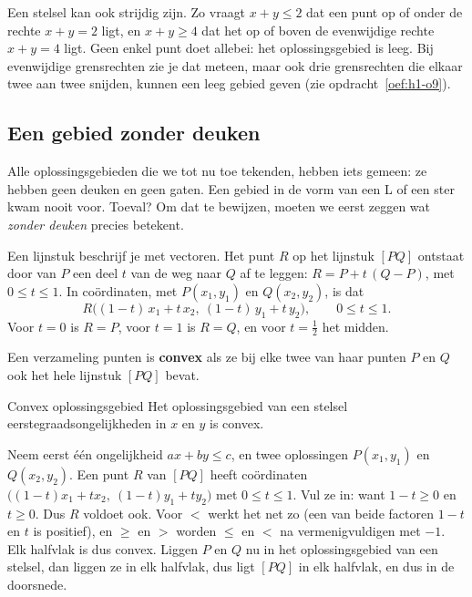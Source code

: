 Een stelsel kan ook strijdig zijn. Zo vraagt $x + y \leqslant 2$ dat een punt op of onder de rechte $x + y = 2$ ligt, en $x + y \geqslant 4$ dat het op of boven de evenwijdige rechte $x + y = 4$ ligt. Geen enkel punt doet allebei: het oplossingsgebied is leeg. Bij evenwijdige grensrechten zie je dat meteen, maar ook drie grensrechten die elkaar twee aan twee snijden, kunnen een leeg gebied geven (zie opdracht~\ref{oef:h1-o9}).

\begin{oefeningen}
\end{oefeningen}

\subsection{Een gebied zonder deuken}

Alle oplossingsgebieden die we tot nu toe tekenden, hebben iets gemeen: ze hebben geen deuken en geen gaten. Een gebied in de vorm van een L of een ster kwam nooit voor. Toeval? Om dat te bewijzen, moeten we eerst zeggen wat \textit{zonder deuken} precies betekent.

Een lijnstuk beschrijf je met vectoren. Het punt $R$ op het lijnstuk $[PQ]$ ontstaat door van $P$ een deel $t$ van de weg naar $Q$ af te leggen: $R = P + t\,(Q - P)$, met $0 \leqslant t \leqslant 1$. In coördinaten, met $P(x_1, y_1)$ en $Q(x_2, y_2)$, is dat
\[ R\bigl((1 - t)\,x_1 + t\,x_2,\ (1 - t)\,y_1 + t\,y_2\bigr), \qquad 0 \leqslant t \leqslant 1 . \]
Voor $t = 0$ is $R = P$, voor $t = 1$ is $R = Q$, en voor $t = \tfrac12$ het midden.

\begin{theorie}
Een verzameling punten is \textbf{\textcolor{accent}{convex}} als ze bij elke twee van haar punten $P$ en $Q$ ook het hele lijnstuk $[PQ]$ bevat.

\begin{stelling}{Convex oplossingsgebied}
Het oplossingsgebied van een stelsel eerstegraadsongelijkheden in $x$ en $y$ is convex.
\end{stelling}

\begin{bewijs}
Neem eerst één ongelijkheid $ax + by \leqslant c$, en twee oplossingen $P(x_1, y_1)$ en $Q(x_2, y_2)$. Een punt $R$ van $[PQ]$ heeft coördinaten $\bigl((1 - t)x_1 + tx_2,\ (1 - t)y_1 + ty_2\bigr)$ met $0 \leqslant t \leqslant 1$. Vul ze in:
want $1 - t \geqslant 0$ en $t \geqslant 0$. Dus $R$ voldoet ook. Voor $<$ werkt het net zo (een van beide factoren $1 - t$ en $t$ is positief), en $\geqslant$ en $>$ worden $\leqslant$ en $<$ na vermenigvuldigen met $-1$. Elk halfvlak is dus convex. Liggen $P$ en $Q$ nu in het oplossingsgebied van een stelsel, dan liggen ze in elk halfvlak, dus ligt $[PQ]$ in elk halfvlak, en dus in de doorsnede.
\end{bewijs}
\end{theorie}


